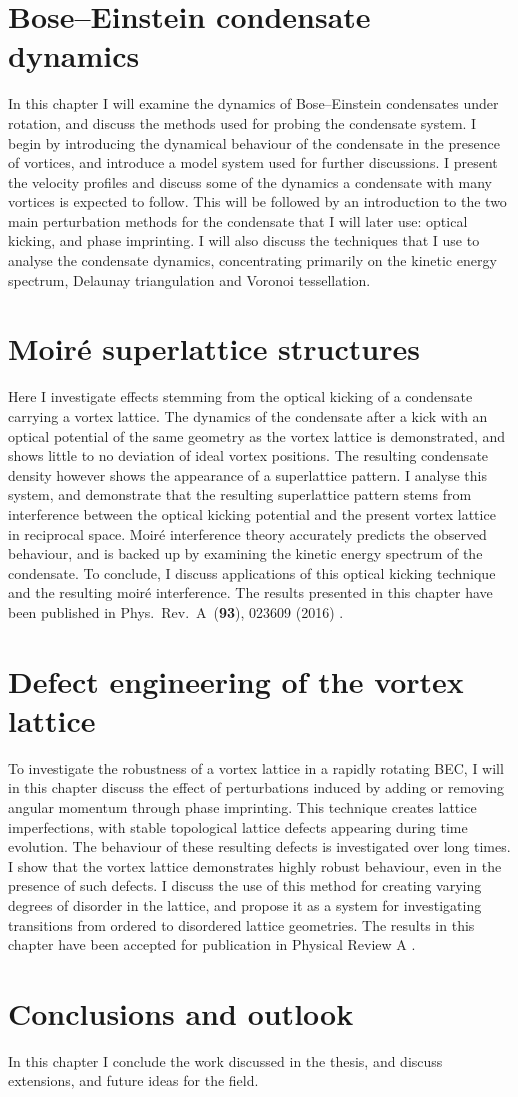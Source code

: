 \section*{Bose--Einstein condensate dynamics}
In this chapter I will examine the dynamics of Bose--Einstein condensates under rotation, and discuss the methods used for probing the condensate system. I begin by introducing the dynamical behaviour of the condensate in the presence of vortices, and introduce a model system used for further discussions. I present the velocity profiles and discuss some of the dynamics a condensate with many vortices is expected to follow. This will be followed by an introduction to the two main perturbation methods for the condensate that I will later use: optical kicking, and phase imprinting. I will also discuss the techniques that I use to analyse the condensate dynamics, concentrating primarily on the kinetic energy spectrum, Delaunay triangulation and Voronoi tessellation.

\section*{Moir\'e superlattice structures}
Here I investigate effects stemming from the optical kicking of a condensate carrying a vortex lattice. The dynamics of the condensate after a kick with an optical potential of the same geometry as the vortex lattice is demonstrated, and shows little to no deviation of ideal vortex positions. The resulting condensate density however shows the appearance of a superlattice pattern. I analyse this system, and demonstrate that the resulting superlattice pattern stems from interference between the optical kicking potential and the present vortex lattice in reciprocal space. Moir\'e interference theory accurately predicts the observed behaviour, and is backed up by examining the kinetic energy spectrum of the condensate. To conclude, I discuss applications of this optical kicking technique and the resulting moir\'e interference. The results presented in this chapter have been published in Phys.~Rev.~A~(\textbf{93}), 023609 (2016) \cite{VTX:oriordan_pra_2016}.

\section*{Defect engineering of the vortex lattice}
To investigate the robustness of a vortex lattice in a rapidly rotating BEC, I will in this chapter discuss the effect of perturbations induced by adding or removing angular momentum through phase imprinting. This technique creates lattice imperfections, with stable topological lattice defects appearing during time evolution. The behaviour of these resulting defects is investigated over long times. I show that the vortex lattice demonstrates highly robust behaviour, even in the presence of such defects. I discuss the use of this method for creating varying degrees of disorder in the lattice, and propose it as a system for investigating transitions from ordered to disordered lattice geometries. The results in this chapter have been accepted for publication in Physical Review A \cite{ME:arxiv_defect}.

\section*{Conclusions and outlook}
In this chapter I conclude the work discussed in the thesis, and discuss extensions, and future ideas for the field.
